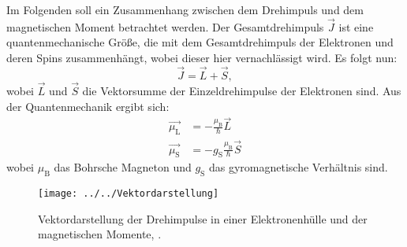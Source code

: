 Im Folgenden soll ein Zusammenhang zwischen dem Drehimpuls und dem magnetischen Moment betrachtet werden. 
Der Gesamtdrehimpuls $\vec{J}$ ist eine quantenmechanische Größe, die mit dem Gesamtdrehimpuls der Elektronen und deren Spins zusammenhängt, wobei dieser hier vernachlässigt wird. 
Es folgt nun:
\begin{equation*}
\vec{J} = \vec{L} + \vec{S},
\end{equation*}
wobei $\vec{L}$ und $\vec{S}$ die Vektorsumme der Einzeldrehimpulse der Elektronen sind. Aus der Quantenmechanik ergibt sich:
\begin{align*}
\vec{\mu_\text{L}} &= -\frac{\mu_\text{B}}{\hbar}\vec{L} \\
\vec{\mu_\text{S}} &= -g_\text{S}\frac{\mu_\text{B}}{\hbar}\vec{S} 
\end{align*}
wobei $\mu_\text{B}$ das Bohrsche Magneton und $g_\text{S}$ das gyromagnetische Verhältnis sind. 
\begin{figure}[h!]
	\centering
	\texttt{[image: ../../Vektordarstellung]}
	\caption{Vektordarstellung der Drehimpulse in einer Elektronenhülle und der magnetischen Momente, \cite[3]{anleitung606}.}
	\label{fig:vektordarstellung}
\end{figure}


